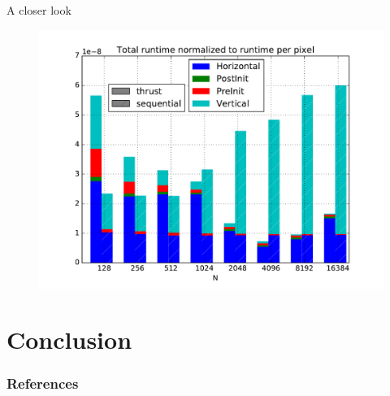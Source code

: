 \documentclass{beamer}
\begin{document}
\begin{frame}{A closer look}
  \begin{figure}
    \includegraphics[scale=0.4]{imgs/thrust_vs_sequential_normalized.pdf} 
  \end{figure}
\end{frame} 


\section{Conclusion} 

\begin{frame}[t]
  \frametitle{References}
  
  
\end{frame}
\end{document}
